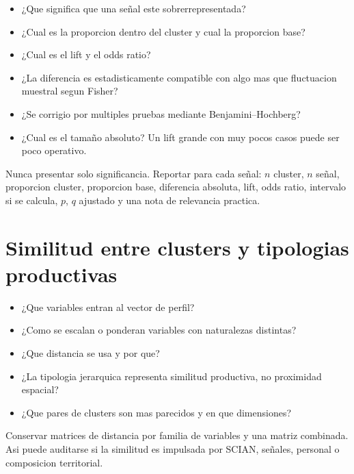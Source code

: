 \documentclass[11pt,letterpaper]{article}
\begin{document}
\begin{preguntas}
\begin{itemize}
    \item ¿Que significa que una señal este sobrerrepresentada?
    \item ¿Cual es la proporcion dentro del cluster y cual la proporcion base?
    \item ¿Cual es el lift y el odds ratio?
    \item ¿La diferencia es estadisticamente compatible con algo mas que fluctuacion muestral segun Fisher?
    \item ¿Se corrigio por multiples pruebas mediante Benjamini--Hochberg?
    \item ¿Cual es el tamaño absoluto? Un lift grande con muy pocos casos puede ser poco operativo.
\end{itemize}
\end{preguntas}

\begin{evidencia}
Nunca presentar solo significancia. Reportar para cada señal: $n$ cluster, $n$ señal, proporcion cluster, proporcion base, diferencia absoluta, lift, odds ratio, intervalo si se calcula, $p$, $q$ ajustado y una nota de relevancia practica.
\end{evidencia}

\section{Similitud entre clusters y tipologias productivas}

\begin{preguntas}
\begin{itemize}
    \item ¿Que variables entran al vector de perfil?
    \item ¿Como se escalan o ponderan variables con naturalezas distintas?
    \item ¿Que distancia se usa y por que?
    \item ¿La tipologia jerarquica representa similitud productiva, no proximidad espacial?
    \item ¿Que pares de clusters son mas parecidos y en que dimensiones?
\end{itemize}
\end{preguntas}

\begin{trazabilidad}
Conservar matrices de distancia por familia de variables y una matriz combinada. Asi puede auditarse si la similitud es impulsada por SCIAN, señales, personal o composicion territorial.
\end{trazabilidad}
\end{document}
